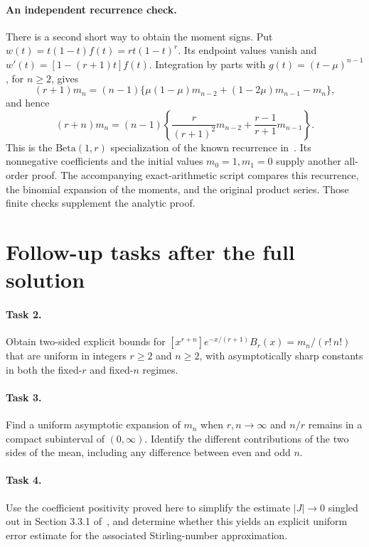 \documentclass[11pt]{article}
\begin{document}
\paragraph{An independent recurrence check.}
There is a second short way to obtain the moment signs. Put
$w(t)=t(1-t)f(t)=rt(1-t)^r$. Its endpoint values vanish and
$w'(t)=[1-(r+1)t]f(t)$. Integration by parts with
$g(t)=(t-\mu)^{n-1}$, for $n\geq2$, gives
\[
 (r+1)m_n
 =(n-1)\{\mu(1-\mu)m_{n-2}+(1-2\mu)m_{n-1}-m_n\},
\]
and hence
\begin{equation}\label{eq:recurrence}
 (r+n)m_n=(n-1)
 \left\{\frac{r}{(r+1)^2}m_{n-2}
       +\frac{r-1}{r+1}m_{n-1}\right\}.
\end{equation}
This is the $\mathrm{Beta}(1,r)$ specialization of the known recurrence
in~\cite[Theorem 3]{Skorski}. Its nonnegative coefficients and the initial
values $m_0=1,m_1=0$ supply another all-order proof.
The accompanying exact-arithmetic script compares this recurrence,
the binomial expansion of the moments, and the original product series.
Those finite checks supplement the analytic proof.

\section*{Follow-up tasks after the full solution}
\paragraph{Task 2.}
Obtain two-sided explicit bounds for
$[x^{r+n}]e^{-x/(r+1)}B_r(x)=m_n/(r!\,n!)$ that are uniform in
integers $r\geq2$ and $n\geq2$, with asymptotically sharp constants
in both the fixed-$r$ and fixed-$n$ regimes.

\paragraph{Task 3.}
Find a uniform asymptotic expansion of $m_n$ when $r,n\to\infty$
and $n/r$ remains in a compact subinterval of $(0,\infty)$.
Identify the different contributions of the two sides of the mean,
including any difference between even and odd $n$.

\paragraph{Task 4.}
Use the coefficient positivity proved here to simplify the estimate
$|J|\to0$ singled out in Section 3.3.1 of~\cite{CHH}, and determine
whether this yields an explicit uniform error estimate for the
associated Stirling-number approximation.
\end{document}
